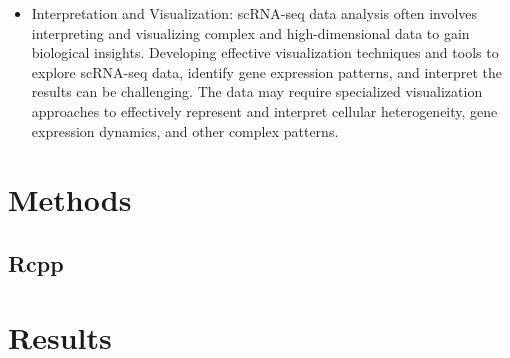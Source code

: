 \documentclass[12pt]{extarticle}
\begin{document}
\begin{itemize}
    \item Interpretation and Visualization: scRNA-seq data analysis often involves interpreting and visualizing complex and high-dimensional data to gain biological insights. Developing effective visualization techniques and tools to explore scRNA-seq data, identify gene expression patterns, and interpret the results can be challenging. The data may require specialized visualization approaches to effectively represent and interpret cellular heterogeneity, gene expression dynamics, and other complex patterns.

\end{itemize}

\newpage

\section{Methods}

\subsection{}

\subsection{Rcpp}

\newpage

\section{Results}

\newpage

\printbibliography

\listoffigures
\end{document}
